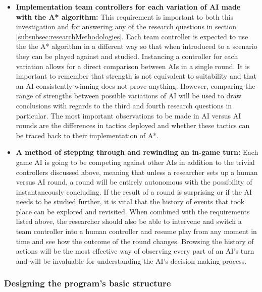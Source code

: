 \documentclass[11pt, a4paper]{article}
\begin{document}
\begin{itemize}
\item \textbf{Implementation team controllers for each variation of AI made with the A* algorithm:}
This requirement is important to both this investigation and for answering any of the research questions in section \ref{subsubsec:researchMethodologies}. Each team controller is expected to use the the A* algorithm in a different way so that when introduced to a scenario they can be played against and studied. Instancing a controller for each variation allows for a direct comparison between AIs in a single round. It is important to remember that strength is not equivalent to suitability and that an AI consistently winning does not prove anything. However, comparing the range of strengths between possible variations of AI will be used to draw conclusions with regards to the third and fourth research questions in particular. The most important observations to be made in AI versus AI rounds are the differences in tactics deployed and whether these tactics can be traced back to their implementation of A*.

\item \textbf{A method of stepping through and rewinding an in-game turn:}
Each game AI is going to be competing against other AIs in addition to the trivial controllers discussed above, meaning that unless a researcher sets up a human versus AI round, a round will be entirely autonomous with the possibility of instantaneously concluding. If the result of a round is surprising or if the AI needs to be studied further, it is vital that the history of events that took place can be explored and revisited. When combined with the requirements listed above, the researcher should also be able to intervene and switch a team controller into a human controller and resume play from any moment in time and see how the outcome of the round changes. Browsing the history of actions will be the most effective way of observing every part of an AI's turn and will be invaluable for understanding the AI's decision making process.

\end{itemize}

\subsubsection{Designing the program's basic structure}
\label{subsubsec:designingProgram}
\end{document}
